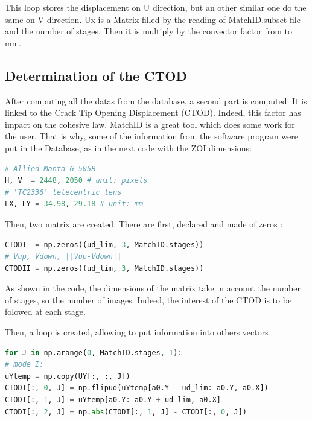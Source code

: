 This loop stores the displacement on U direction, but an other similar one do the same on V direction. Ux is a Matrix filled by the reading of MatchID.subset file and the number of stages. Then it is multiply by the convector factor from \si{\pixel} to \si{\milli\meter}. 


\subsection{Determination of the CTOD} 

After computing all the datas from the database, a second part is computed. It is linked to the Crack Tip Opening Displacement (CTOD). Indeed, this factor has impact on the cohesive law. MatchID is a great tool which does some work for the user. That is why, some of the information from the software program were put in the Database, as in the next code with the ZOI dimensions: 
\begin{lstlisting}[language=Python]
# Allied Manta G-505B
H, V  = 2448, 2050 # unit: pixels
# 'TC2336' telecentric lens
LX, LY = 34.98, 29.18 # unit: mm
\end{lstlisting}

Then, two matrix are created. There are first, declared and made of zeros :

\begin{lstlisting}[language=Python]
CTODI  = np.zeros((ud_lim, 3, MatchID.stages))
# Vup, Vdown, ||Vup-Vdown||
CTODII = np.zeros((ud_lim, 3, MatchID.stages))
\end{lstlisting}

As shown in the code, the dimensions of the matrix take in account the number of stages, so the number of images. Indeed, the interest of the CTOD is to be folowed at each stage. 

Then, a loop is created, allowing to put information into others vectors

\begin{lstlisting}[language=Python]
for J in np.arange(0, MatchID.stages, 1):
# mode I:
uYtemp = np.copy(UY[:, :, J])
CTODI[:, 0, J] = np.flipud(uYtemp[a0.Y - ud_lim: a0.Y, a0.X])
CTODI[:, 1, J] = uYtemp[a0.Y: a0.Y + ud_lim, a0.X]
CTODI[:, 2, J] = np.abs(CTODI[:, 1, J] - CTODI[:, 0, J])
\end{lstlisting}

